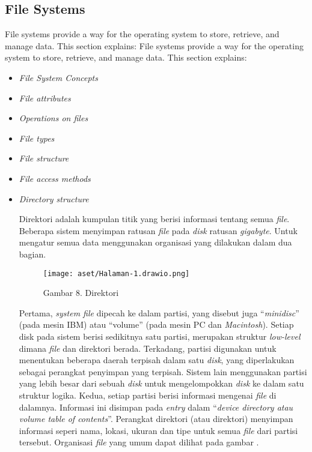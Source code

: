 \documentclass[12pt]{article}
\begin{document}
	\subsection{File Systems}
	File systems provide a way for the operating system to store, retrieve, and manage data. This section explains: 
	File systems provide a way for the operating system to store, retrieve, and manage data. This section explains:
	\begin{itemize}
		\item \textit{File System Concepts}
		\item \textit{File attributes}
		\item \textit{Operations on files}
		\item \textit{File types}
		\item \textit{File structure}
		\item \textit{File access methods}
		\item \textit{Directory structure}
		
		Direktori adalah kumpulan titik yang berisi informasi tentang semua \textit{file}. Beberapa sistem menyimpan ratusan \textit{file} pada \textit{disk} ratusan \textit{gigabyte}. Untuk mengatur semua data menggunakan organisasi yang dilakukan dalam dua bagian.
		
		\begin{figure}[h!]
			\centering
			\texttt{[image: aset/Halaman-1.drawio.png]}
			\captionsetup{labelformat=empty}
			\caption{Gambar 8. Direktori}
		\end{figure}
		
		Pertama,\textit{ system file} dipecah ke dalam partisi, yang disebut juga “\textit{minidisc}” (pada mesin IBM) atau “volume” (pada mesin PC dan \textit{Macintosh}). Setiap disk pada sistem berisi sedikitnya satu partisi, merupakan struktur \textit{low-level} dimana \textit{file} dan direktori berada. Terkadang, partisi digunakan untuk menentukan beberapa daerah terpisah dalam satu \textit{disk}, yang diperlakukan sebagai perangkat penyimpan yang terpisah. Sistem lain menggunakan partisi yang lebih besar dari sebuah \textit{disk} untuk mengelompokkan \textit{disk} ke dalam satu struktur logika. Kedua, setiap partisi berisi informasi mengenai \textit{file }di dalamnya. Informasi ini disimpan pada\textit{ entry }dalam “\textit{device directory atau volume table of contents}”. Perangkat direktori (atau direktori) menyimpan informasi seperi nama, lokasi, ukuran dan tipe untuk semua\textit{ file} dari partisi tersebut. Organisasi \textit{file} yang umum dapat dilihat pada gambar .
		

\end{itemize}
\end{document}
